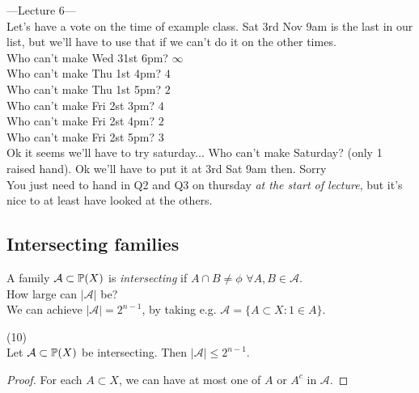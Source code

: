 \documentclass[a4paper]{article}
\begin{document}
---Lecture 6---\\
Let's have a vote on the time of example class. Sat 3rd Nov 9am is the last in our list, but we'll have to use that if we can't do it on the other times.\\
Who can't make Wed 31st 6pm? $\infty$\\
Who can't make Thu 1st 4pm? $4$\\
Who can't make Thu 1st 5pm? $2$\\
Who can't make Fri 2st 3pm? $4$\\
Who can't make Fri 2st 4pm? $2$\\
Who can't make Fri 2st 5pm? $3$\\
Ok it seems we'll have to try saturday... Who can't make Saturday? (only 1 raised hand). Ok we'll have to put it at 3rd Sat 9am then. Sorry\\
You just need to hand in Q2 and Q3 on thursday \emph{at the start of lecture}, but it's nice to at least have looked at the others.

\subsection{Intersecting families}

A family $\mathcal{A} \subset \P(X)$ is \emph{intersecting} if $A \cap B \neq \phi$ $\forall A,B \in \mathcal{A}$.\\
How large can $|\mathcal{A}|$ be?\\
We can achieve $|\mathcal{A}| = 2^{n-1}$, by taking e.g. $\mathcal{A} = \{A \subset X: 1 \in A\}$.

\begin{prop} (10)\\
    Let $\mathcal{A} \subset \P(X)$ be intersecting. Then $|\mathcal{A}| \leq 2^{n-1}$.\\
    \begin{proof}
        For each $A \subset X$, we can have at most one of $A$ or $A^c$ in $\mathcal{A}$.
    \end{proof}
\end{prop}
\end{document}

